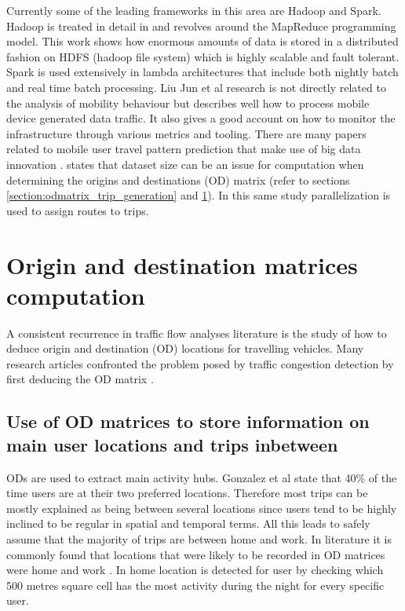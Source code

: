 \documentclass[12pt, a4paper]{report}
\theoremstyle{definition}
\theoremstyle{definition}%
\theoremstyle{definition}%
\theoremstyle{definition}%
\theoremstyle{definition}%
\theoremstyle{definition}%
\begin{document}
Currently some of the leading frameworks in this area are Hadoop and Spark. Hadoop is treated in detail in \cite{Liu2014} and revolves around the MapReduce programming model. This work shows how enormous amounts of data is stored in a distributed fashion on HDFS (hadoop file system) which is highly scalable and fault tolerant. Spark is used extensively in lambda architectures that include both nightly batch and real time batch processing. Liu Jun et al research is not directly related to the analysis of mobility behaviour but describes well how to process mobile device generated data traffic. It also gives a good account on how to monitor the infrastructure through various metrics and tooling. There are many papers related to mobile user travel pattern prediction that make use of big data innovation  \cite{Liu2014,Laurila2012,Kurien2012}. \cite{Toole2015} states that dataset size can be an issue for computation when determining the origins and destinations (OD) matrix (refer to sections \ref{section:odmatrix_trip_generation} and \ref{section:OD_Matrices}). In this same study parallelization is used to assign routes to trips.


\section{Origin and destination matrices computation} \label{section:OD_Matrices}
A consistent recurrence in traffic flow analyses literature is the study of how to deduce origin and destination (OD) locations for travelling vehicles\cite{Iqbal2014}. Many research articles confronted the problem posed by traffic congestion detection by first deducing the OD matrix \cite{Toole2015,Iqbal2014,Alexander2015,Calabrese2011,Calabrese2013,Colak2015}. 

\subsection{Use of OD matrices to store information on main user locations and trips inbetween}

ODs are used to extract main activity hubs. Gonzalez et al state that 40\% of the time users are at their two preferred locations.  Therefore most trips can be mostly explained as being  between several locations since users tend to be highly inclined to be regular in spatial and temporal terms. All this leads to safely assume that the majority of trips are between home and work. In literature it  is commonly found that locations that were likely to be recorded in OD matrices were home and work \cite{Calabrese2011,Colak2015}.  In \cite{Calabrese2011} home location is detected for user by checking which 500 metres square cell has the most activity during the night for every specific user.
\end{document}
